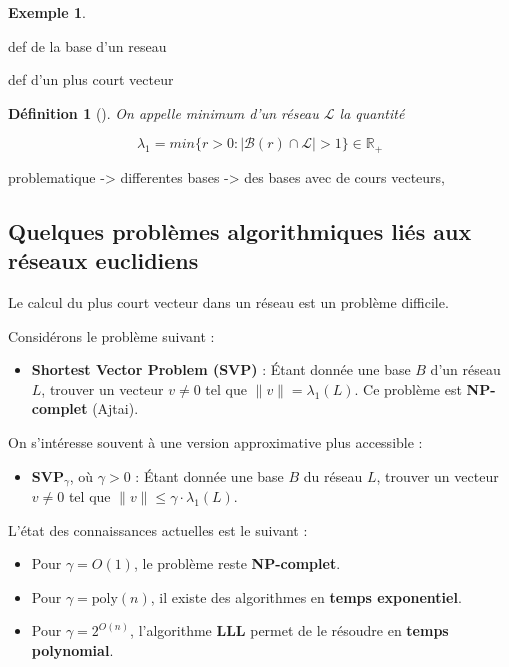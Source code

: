 \documentclass[a4paper,12pt]{report}  %
\theoremstyle{definitionstyle}
\newtheorem{definition}{Définition}[chapter] %
\theoremstyle{examplestyle}
\newtheorem{example}{Exemple}[chapter] %
\theoremstyle{remarkstyle}
\theoremstyle{propositionstyle}
\begin{document}
	
	
	\begin{example}
		
	\end{example}
	def de la base d'un reseau
	
	def d'un plus court vecteur
	
	\begin{definition}[\cite{clef_unique_1}]
		On appelle minimum d'un réseau $\mathcal{L}$ la quantité
		
		$$\lambda_1 = min\{r>0 : |\mathcal{B}(r)\cap\mathcal{L}|>1\} \in \mathbb{R_+}$$
	\end{definition}
	
	
	problematique -> differentes bases -> des bases avec de cours vecteurs,
	
	\subsection{Quelques problèmes algorithmiques liés aux réseaux euclidiens}
	
	Le calcul du plus court vecteur dans un réseau est un problème difficile.
	
	Considérons le problème suivant :
	
	\begin{itemize}
		\item \textbf{Shortest Vector Problem (SVP)} : Étant donnée une base $B$ d’un réseau $L$, trouver un vecteur $v \neq 0$ tel que $\|v\| = \lambda_1(L)$. Ce problème est \textbf{NP-complet} (Ajtai).
	\end{itemize}
	
	On s’intéresse souvent à une version approximative plus accessible :
	
	\begin{itemize}
		\item \textbf{SVP$_\gamma$}, où $\gamma > 0$ : Étant donnée une base $B$ du réseau $L$, trouver un vecteur $v \neq 0$ tel que $\|v\| \leq \gamma \cdot \lambda_1(L)$.
	\end{itemize}
	
	L’état des connaissances actuelles est le suivant :
	
	\begin{itemize}
		\item Pour $\gamma = O(1)$, le problème reste \textbf{NP-complet}.
		\item Pour $\gamma = \text{poly}(n)$, il existe des algorithmes en \textbf{temps exponentiel}.
		\item Pour $\gamma = 2^{O(n)}$, l’algorithme \textbf{LLL} permet de le résoudre en \textbf{temps polynomial}.
	\end{itemize}
	
\end{document}
